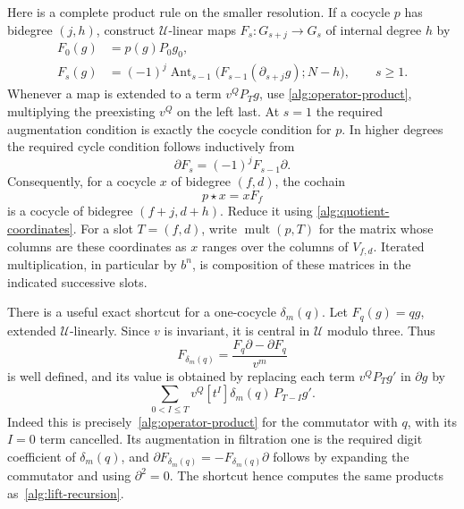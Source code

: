 Here is a complete product rule on the smaller resolution.  If a
cocycle $p$ has bidegree $(j,h)$, construct $\mathcal U$-linear maps
$F_s:G_{s+j}\to G_s$ of internal degree $h$ by
\begin{align}
 F_0(g)&=p(g)P_0g_0,\label{alg:lift-base}\\
 F_s(g)&=(-1)^j\operatorname{Ant}_{s-1}
       \bigl(F_{s-1}(\partial_{s+j}g);N-h\bigr),\qquad s\geq1.
       \label{alg:lift-recursion}
\end{align}
Whenever a map is extended to a term $v^QP_Tg$, use
\eqref{alg:operator-product}, multiplying the preexisting $v^Q$ on the
left last.  At $s=1$ the required augmentation condition is exactly the
cocycle condition for $p$.  In higher degrees the required cycle
condition follows inductively from
\begin{equation}\label{alg:signed-lift-identity}
 \partial F_s=(-1)^jF_{s-1}\partial.
\end{equation}
Consequently, for a cocycle $x$ of bidegree $(f,d)$, the cochain
\begin{equation}\label{alg:product}
 p\star x=xF_f
\end{equation}
is a cocycle of bidegree $(f+j,d+h)$.  Reduce it using
\eqref{alg:quotient-coordinates}.  For a slot $T=(f,d)$, write
$\operatorname{mult}(p,T)$ for the matrix whose columns are these
coordinates as $x$ ranges over the columns of $V_{f,d}$.
Iterated multiplication, in particular by $b^n$, is composition of
these matrices in the indicated successive slots.

There is a useful exact shortcut for a one-cocycle $\delta_m(q)$.
Let $F_q(g)=qg$, extended $\mathcal U$-linearly.  Since $v$ is invariant,
it is central in $\mathcal U$ modulo three.  Thus
\begin{equation}\label{alg:delta-lift}
 F_{\delta_m(q)}=\frac{F_q\partial-\partial F_q}{v^m}
\end{equation}
is well defined, and its value is obtained by replacing each term
$v^QP_Tg'$ in $\partial g$ by
\begin{equation}\label{alg:delta-lift-terms}
 \sum_{0<I\leq T}v^Q[t^I]\delta_m(q)\,P_{T-I}g'.
\end{equation}
Indeed this is precisely~\eqref{alg:operator-product} for the
commutator with $q$, with its $I=0$ term cancelled.  Its augmentation
in filtration one is the required digit coefficient of $\delta_m(q)$,
and $\partial F_{\delta_m(q)}=-F_{\delta_m(q)}\partial$ follows by
expanding the commutator and using $\partial^2=0$.  The shortcut hence
computes the same products as~\eqref{alg:lift-recursion}.

